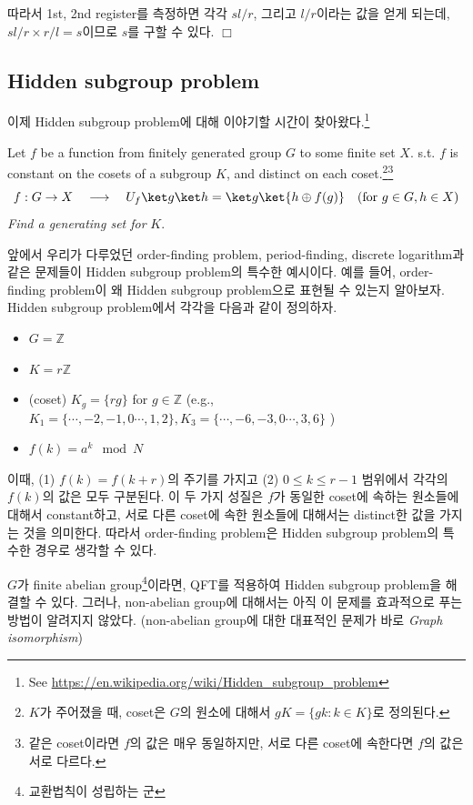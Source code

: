 따라서 1st, 2nd register를 측정하면 각각 $sl/r$, 그리고 $l/r$이라는 값을 얻게 되는데, $sl/r \times r/l = s$이므로 $s$를 구할 수 있다. $\Box$  

\subsection{Hidden subgroup problem}
이제 Hidden subgroup problem에 대해 이야기할 시간이 찾아왔다.\footnote{See \url{https://en.wikipedia.org/wiki/Hidden_subgroup_problem}}
\begin{definition}
  Let $f$ be a function from finitely generated group $G$ to some finite set $X$. s.t. $f$ is constant on the cosets of a subgroup $K$, and distinct on each coset.\footnote{$K$가 주어졌을 때, coset은 $G$의 원소에 대해서 $gK = \{gk : k \in K\}$로 정의된다.}\footnote{같은 coset이라면 $f$의 값은 매우 동일하지만, 서로 다른 coset에 속한다면 $f$의 값은 서로 다르다.}
  \begin{equation*}
    f: G \rightarrow X \quad  \longrightarrow \quad U_f\ket g \ket h = \ket g \ket{h \oplus f(g)} \quad (\text{for } g \in G, h \in X)
  \end{equation*}
  \textit{Find a generating set for} $K$.
\end{definition}

앞에서 우리가 다루었던 order-finding problem, period-finding, discrete logarithm과 같은 문제들이 Hidden subgroup problem의 특수한 예시이다. 예를 들어, order-finding problem이 왜 Hidden subgroup problem으로 표현될 수 있는지 알아보자.
Hidden subgroup problem에서 각각을 다음과 같이 정의하자.
\begin{itemize}
  \item $G = \mathbb Z$
  \item $K = r\mathbb Z$
  \item (coset) $K_g = \{rg\}$ for $g \in \mathbb Z$ (e.g., $K_1 = \{\cdots, -2, -1, 0 \cdots, 1, 2\}, K_3 = \{\cdots, -6, -3, 0 \cdots, 3, 6\}$ )
  \item $f(k)  = a^k \mod N$
\end{itemize}
이때, (1) $f(k) = f(k+r)$의 주기를 가지고 (2) $0 \leq k \leq r-1$ 범위에서 각각의 $f(k)$의 값은 모두 구분된다. 
이 두 가지 성질은 $f$가 동일한 coset에 속하는 원소들에 대해서 constant하고, 서로 다른 coset에 속한 원소들에 대해서는 distinct한 값을 가지는 것을 의미한다. 따라서 order-finding problem은 Hidden subgroup problem의 특수한 경우로 생각할 수 있다.

$G$가 finite abelian group\footnote{교환법칙이 성립하는 군}이라면, QFT를 적용하여 Hidden subgroup problem을 해결할 수 있다. 그러나, non-abelian group에 대해서는 아직 이 문제를 효과적으로 푸는 방법이 알려지지 않았다. (non-abelian group에 대한 대표적인 문제가 바로 \textit{Graph isomorphism})

